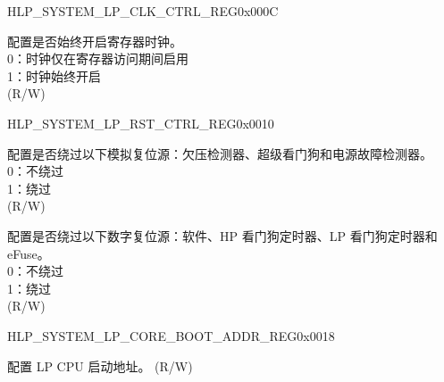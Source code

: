 \begin{register}{H}{LP\_SYSTEM\_LP\_CLK\_CTRL\_REG}{0x000C}\label{regdesc:LPSYSTEMLPCLKCTRLREG}
%
%
\regnewline%
\begin{regdesc}\begin{reglist}
\label{fielddesc:LPSYSTEMCLKEN}\item [LP\_SYSTEM\_CLK\_EN] 配置是否始终开启寄存器时钟。\\
0：时钟仅在寄存器访问期间启用\\
1：时钟始终开启\\
(R/W)
\end{reglist}\end{regdesc}
\end{register}


\begin{register}{H}{LP\_SYSTEM\_LP\_RST\_CTRL\_REG}{0x0010}\label{regdesc:LPSYSTEMLPRSTCTRLREG}
%
%
%
\regnewline%
\begin{regdesc}\begin{reglist}
\label{fielddesc:LPSYSTEMANARSTBYPASS}\item [LP\_SYSTEM\_ANA\_RST\_BYPASS] 配置是否绕过以下模拟复位源：欠压检测器、超级看门狗和电源故障检测器。\\
0：不绕过\\
1：绕过\\
(R/W)
\label{fielddesc:LPSYSTEMSYSRSTBYPASS}\item [LP\_SYSTEM\_SYS\_RST\_BYPASS] 配置是否绕过以下数字复位源：软件、HP 看门狗定时器、LP 看门狗定时器和 eFuse。\\
0：不绕过\\
1：绕过\\
(R/W)
\end{reglist}\end{regdesc}
\end{register}


\begin{register}{H}{LP\_SYSTEM\_LP\_CORE\_BOOT\_ADDR\_REG}{0x0018}\label{regdesc:LPSYSTEMLPCOREBOOTADDRREG}
%
\regnewline%
\begin{regdesc}\begin{reglist}
\label{fielddesc:LPSYSTEMLPCPUBOOTADDR}\item [LP\_SYSTEM\_LP\_CPU\_BOOT\_ADDR] 配置 LP CPU 启动地址。 (R/W)
\end{reglist}\end{regdesc}
\end{register}


